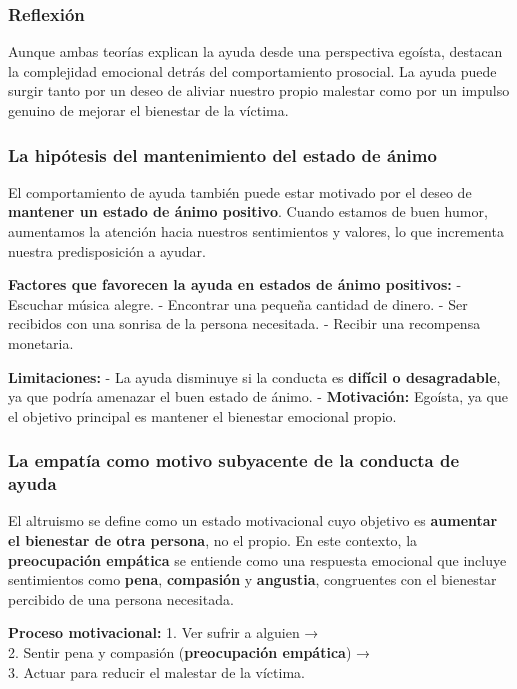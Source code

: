 \documentclass[
]{book}
\begin{document}
\subsubsection{Reflexión}\label{reflexiuxf3n}

Aunque ambas teorías explican la ayuda desde una perspectiva egoísta, destacan la complejidad emocional detrás del comportamiento prosocial. La ayuda puede surgir tanto por un deseo de aliviar nuestro propio malestar como por un impulso genuino de mejorar el bienestar de la víctima.

\subsubsection{La hipótesis del mantenimiento del estado de ánimo}\label{la-hipuxf3tesis-del-mantenimiento-del-estado-de-uxe1nimo}

El comportamiento de ayuda también puede estar motivado por el deseo de \textbf{mantener un estado de ánimo positivo}. Cuando estamos de buen humor, aumentamos la atención hacia nuestros sentimientos y valores, lo que incrementa nuestra predisposición a ayudar.

\textbf{Factores que favorecen la ayuda en estados de ánimo positivos:}
- Escuchar música alegre.
- Encontrar una pequeña cantidad de dinero.
- Ser recibidos con una sonrisa de la persona necesitada.
- Recibir una recompensa monetaria.

\textbf{Limitaciones:}
- La ayuda disminuye si la conducta es \textbf{difícil o desagradable}, ya que podría amenazar el buen estado de ánimo.
- \textbf{Motivación:} Egoísta, ya que el objetivo principal es mantener el bienestar emocional propio.

\subsubsection{La empatía como motivo subyacente de la conducta de ayuda}\label{la-empatuxeda-como-motivo-subyacente-de-la-conducta-de-ayuda}

El altruismo se define como un estado motivacional cuyo objetivo es \textbf{aumentar el bienestar de otra persona}, no el propio. En este contexto, la \textbf{preocupación empática} se entiende como una respuesta emocional que incluye sentimientos como \textbf{pena}, \textbf{compasión} y \textbf{angustia}, congruentes con el bienestar percibido de una persona necesitada.

\textbf{Proceso motivacional:}
1. Ver sufrir a alguien →\\
2. Sentir pena y compasión (\textbf{preocupación empática}) →\\
3. Actuar para reducir el malestar de la víctima.
\end{document}
